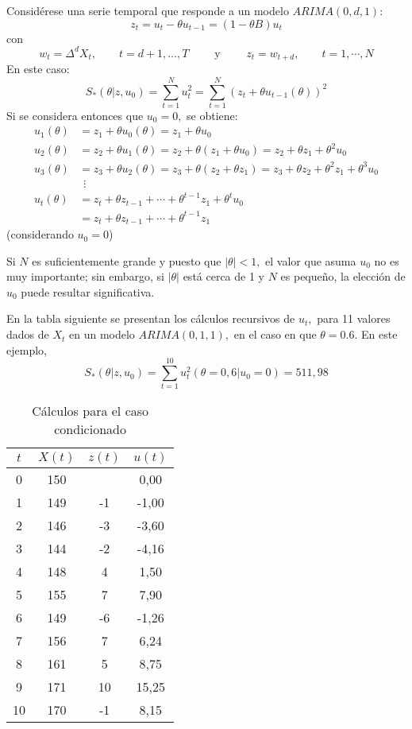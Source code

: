 \begin{ejemplo}
Consid\'{e}rese una serie temporal que responde a un modelo $ARIMA (0,d,1)$:
\[
 z_{t} =u_{t} -\theta u_{t-1} =\left( {1-\theta B} \right)u_{t}
\]
con
\[
w_{t} =\Delta^{d}X_{t} ,\qquad t=d+1,\ldots ,T \qquad \text{ y }\qquad 
z_{t} =w_{t+d} ,\qquad t=1,\cdots ,N
\]
En este caso:
\[
S_{\ast } \left( {\theta \left| {z,u_{0} } \right.} 
\right)=\sum_{t=1}^N {u_{t}^{2} =\sum_{t=1}^N {\left( {z_{t} 
+\theta u_{t-1} \left( \theta \right)} \right)^{2}} } 
\]
Si se considera entonces que $u_{0} =0,$ se obtiene:
\begin{align*}
 u_{1} \left( \theta \right)&=z_{1} +\theta u_{0} \left( \theta \right)=z_{1} +\theta u_{0} \\ 
 u_{2} \left( \theta \right)&=z_{2} +\theta u_{1} \left( \theta \right)=z_{2} +\theta \left( {z_{1} +\theta u_{0} } \right)=z_{2} +\theta z_{1} +\theta^{2}u_{0} \\ 
 u_{3} \left( \theta \right)&=z_{3} +\theta u_{2} \left( \theta \right)=z_{3} +\theta \left( {z_{2} +\theta z_{1} } \right)=z_{3} +\theta z_{2} +\theta^{2}z_{1} +\theta^{3}u_{0} \\ 
 &\ \ \vdots \\ 
 u_{t} \left( \theta \right)&=z_{t} +\theta z_{t-1} +\cdots +\theta ^{t-1}z_{1} +\theta^{t}u_{0} \\ 
 &=z_{t} +\theta z_{t-1} +\cdots +\theta^{t-1}z_{1} 
\end{align*}
(considerando $u_{0} =0$)

Si $N$ es suficientemente grande y puesto que $\left| \theta \right|<1,$ el 
valor que asuma $u_{0} $ no es muy importante; sin embargo, si $\left| 
\theta \right|$ est\'{a} cerca de 1 y $N$ es peque\~{n}o, la elecci\'{o}n de 
$u_{0} $ puede resultar significativa.

En la tabla siguiente se presentan los c\'{a}lculos recursivos de $u_{t} ,$ 
para 11 valores dados de $X_{t} $ en un modelo $ARIMA\left( {0,1,1} 
\right),$ en el caso en que $\theta=0.6$. En este ejemplo, 
\[
S_{\ast } \left( {\theta \left| {z,u_{0} } \right.} 
\right)=\sum_{t=1}^{10} {u_{t}^{2} \left( {\theta =0,6\left| {u_{0} 
=0} \right.} \right)=511,98} 
\]

\begin{table}[H]
\centering\small
\caption{C\'{a}lculos para el caso condicionado}
\begin{tabular}{@{} cccc @{}}
\toprule
$t$& $X(t)$& $z(t)$& $u(t)$ \\
\midrule
0& 150& & 0,00 \\
1& 149& -1& -1,00 \\
2& 146& -3& -3,60 \\
3& 144& -2& -4,16 \\
4& 148& 4& 1,50 \\
5& 155& 7& 7,90 \\
6& 149& -6& -1,26 \\
7& 156& 7& 6,24 \\
8& 161& 5& 8,75 \\
9& 171& 10& 15,25 \\
10& 170& -1& 8,15 \\
\bottomrule
\end{tabular}
\end{table}


\end{ejemplo}

